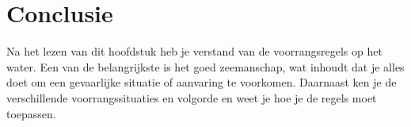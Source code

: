 \section{Conclusie}
Na het lezen van dit hoofdstuk heb je verstand van de voorrangsregels op het water. Een van de belangrijkste is het goed zeemanschap, wat inhoudt dat je alles doet om een gevaarlijke situatie of aanvaring te voorkomen. Daarnaast ken je de verschillende voorrangssituaties en volgorde en weet je hoe je de regels moet toepassen. 